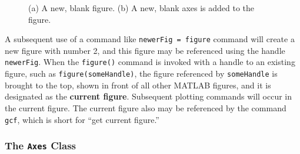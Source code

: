 \begin{figure}[htbp] %
   \centering
   \quad
   \caption{(a) A new, blank figure. (b) A new, blank axes is added to the figure.}
   \label{fig:NewFigNewAx}
\end{figure}

A subsequent use of a command like \texttt{newerFig = figure} command will create a new figure with number 2, and this figure may be referenced using the handle \texttt{newerFig}. When the \texttt{figure()} command is invoked with a handle to an existing figure, such as \texttt{figure(someHandle)}, the figure referenced by \texttt{someHandle} is brought to the top, shown in front of all other MATLAB figures, and it is designated as the \textbf{current figure}. Subsequent plotting commands will occur in the current figure. The current figure also may be referenced by the command \texttt{gcf}, which is short for ``get current figure.''
\subsubsection{The \texttt{Axes} Class}

